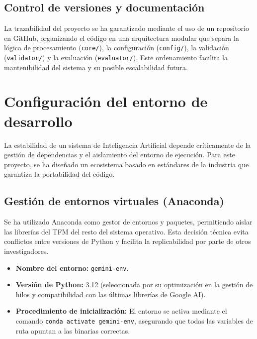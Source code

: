 \subsection{Control de versiones y documentación}

La trazabilidad del proyecto se ha garantizado mediante el uso de un repositorio en GitHub, organizando el código en una arquitectura modular que separa la lógica de procesamiento (\texttt{core/}), la configuración (\texttt{config/}), la validación (\texttt{validator/}) y la evaluación (\texttt{evaluator/}). Este ordenamiento facilita la mantenibilidad del sistema y su posible escalabilidad futura.
    

\section{Configuración del entorno de desarrollo}

La estabilidad de un sistema de Inteligencia Artificial depende críticamente de la gestión de dependencias y el aislamiento del entorno de ejecución. Para este proyecto, se ha diseñado un ecosistema basado en estándares de la industria que garantiza la portabilidad del código.

\subsection{Gestión de entornos virtuales (Anaconda)}

Se ha utilizado Anaconda como gestor de entornos y paquetes, permitiendo aislar las librerías del TFM del resto del sistema operativo. Esta decisión técnica evita conflictos entre versiones de Python y facilita la replicabilidad por parte de otros investigadores.

\begin{itemize}
    \item \textbf{Nombre del entorno:} \texttt{gemini-env}.
    
    \item \textbf{Versión de Python:} 3.12 (seleccionada por su optimización en la gestión de hilos y compatibilidad con las últimas librerías de Google AI).
    
    \item \textbf{Procedimiento de inicialización:} El entorno se activa mediante el comando \texttt{conda activate gemini-env}, asegurando que todas las variables de ruta apuntan a las binarias correctas.
\end{itemize}

